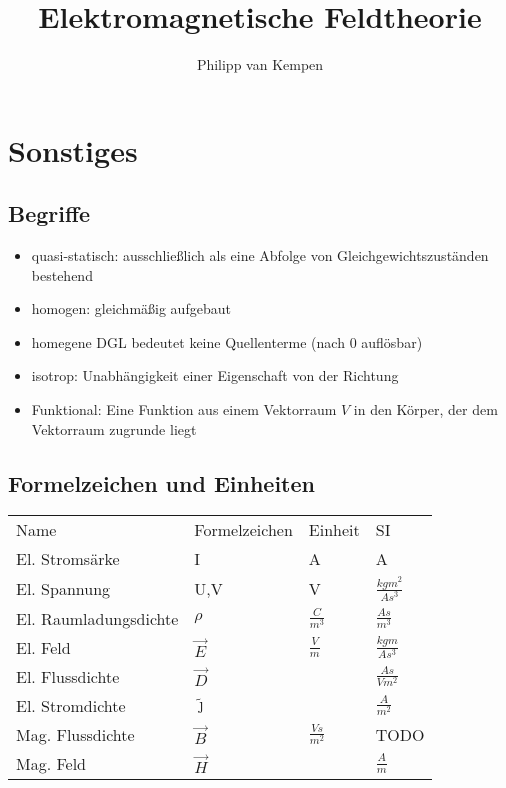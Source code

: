 \documentclass[english]{latex4ei/latex4ei_sheet}
\title{Elektromagnetische Feldtheorie}
\author{Philipp van Kempen}					%
\begin{document}
\newcommand{\Lim}[1]{\raisebox{0.5ex}{\scalebox{0.8}{$\displaystyle \lim_{#1    }\;$}}}
\maketitle	%

\section*{Sonstiges}
\subsection*{Begriffe}
\begin{itemize}
\item quasi-statisch: ausschließlich als eine Abfolge von Gleichgewichtszuständen bestehend
\item homogen: gleichmäßig aufgebaut
\item homegene DGL bedeutet keine Quellenterme (nach $0$ aufl\"osbar)
\item isotrop: Unabhängigkeit einer Eigenschaft von der Richtung
\item Funktional: Eine Funktion aus einem Vektorraum $V$ in den Körper, der dem Vektorraum zugrunde liegt
\end{itemize}
\subsection*{Formelzeichen und Einheiten}
\begin{tabular}{llll}
Name                  & Formelzeichen & Einheit           & SI                       \\
El. Stroms\"arke      & I             & A                 & A                        \\
El. Spannung          & U,V           & V                 & $\frac{kg m^2}{A s^3}$   \\
El. Raumladungsdichte & $\rho$        & $\frac{C}{m^3}$   & $\frac{A s}{m^3}$    \\
El. Feld              & $\vec{E}$     & $\frac{V}{m}$ & $\frac{kg m}{A s^3}$     \\            
El. Flussdichte       & $\vec{D}$     &                   & $\frac{A s}{V m^2}$      \\
El. Stromdichte       & $\tilde{\jmath}$     &					  & $\frac{A}{m^2}$          \\
Mag. Flussdichte      & $\vec{B}$     & $\frac{V s}{m^2}$ & TODO					 \\
Mag. Feld             & $\vec{H}$	  &					  & $\frac{A}{m}$            \\
\end{tabular}
\end{document}
